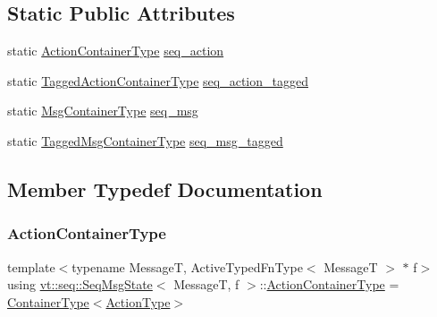 \subsection*{Static Public Attributes}
\begin{DoxyCompactItemize}
\item 
static \hyperlink{structvt_1_1seq_1_1_seq_msg_state_a8a998ddbdeee6bd4882f82e0cb1cd6f1}{Action\+Container\+Type} \hyperlink{structvt_1_1seq_1_1_seq_msg_state_a6b3ec1ba43d08da03dd01ab35c09183e}{seq\+\_\+action}
\item 
static \hyperlink{structvt_1_1seq_1_1_seq_msg_state_a0f9787d4224b8017484093f967200209}{Tagged\+Action\+Container\+Type} \hyperlink{structvt_1_1seq_1_1_seq_msg_state_adfedcf2ab7380df759c8cf2f6c7dd481}{seq\+\_\+action\+\_\+tagged}
\item 
static \hyperlink{structvt_1_1seq_1_1_seq_msg_state_a6821f61ac6a41b210001f49224ed4c9e}{Msg\+Container\+Type} \hyperlink{structvt_1_1seq_1_1_seq_msg_state_a28b0d568f25cb87c942213b6c89e8cd9}{seq\+\_\+msg}
\item 
static \hyperlink{structvt_1_1seq_1_1_seq_msg_state_a57de558c4a7efb36b5358117c6f6d4c5}{Tagged\+Msg\+Container\+Type} \hyperlink{structvt_1_1seq_1_1_seq_msg_state_ae18d41c6d80d485db4aecf3e6fc9ca28}{seq\+\_\+msg\+\_\+tagged}
\end{DoxyCompactItemize}


\subsection{Member Typedef Documentation}
\mbox{\label{structvt_1_1seq_1_1_seq_msg_state_a8a998ddbdeee6bd4882f82e0cb1cd6f1}} 
\subsubsection{\texorpdfstring{Action\+Container\+Type}{ActionContainerType}}
{\footnotesize\ttfamily template$<$typename MessageT, Active\+Typed\+Fn\+Type$<$ Message\+T $>$ $\ast$ f$>$ \\
using \hyperlink{structvt_1_1seq_1_1_seq_msg_state}{vt\+::seq\+::\+Seq\+Msg\+State}$<$ MessageT, f $>$\+::\hyperlink{structvt_1_1seq_1_1_seq_msg_state_a8a998ddbdeee6bd4882f82e0cb1cd6f1}{Action\+Container\+Type} =  \hyperlink{structvt_1_1seq_1_1_seq_msg_state_ad68f7069acda4ef74f973422f368c6e1}{Container\+Type}$<$\hyperlink{structvt_1_1seq_1_1_seq_msg_state_aaca45f0ba55ada8eb7b66f0fd9cab501}{Action\+Type}$>$}

